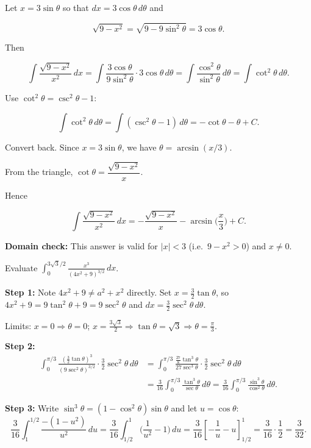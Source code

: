 \begin{examplebox}[title={Worked Example: $\displaystyle \int \frac{\sqrt{9-x^2}}{x^2}\,dx$}]

Let $x=3\sin\theta$ so that $dx=3\cos\theta\,d\theta$ and

\[
\sqrt{9-x^2}=\sqrt{9-9\sin^2\theta}=3\cos\theta.
\]

Then

\[
\int \frac{\sqrt{9-x^2}}{x^2}\,dx
=\int \frac{3\cos\theta}{9\sin^2\theta}\cdot 3\cos\theta\,d\theta
=\int \frac{\cos^2\theta}{\sin^2\theta}\,d\theta
=\int \cot^2\theta\,d\theta.
\]

Use $\cot^2\theta=\csc^2\theta-1$:

\[
\int \cot^2\theta\,d\theta=\int (\csc^2\theta-1)\,d\theta
=-\cot\theta-\theta+C.
\]

Convert back. Since $x=3\sin\theta$, we have $\theta=\arcsin(x/3)$.

From the triangle, $\cot\theta=\dfrac{\sqrt{9-x^2}}{x}$.

Hence

\[
\int \frac{\sqrt{9-x^2}}{x^2}\,dx
=-\frac{\sqrt{9-x^2}}{x}-\arcsin\!\Big(\frac{x}{3}\Big)+C.
\]

\textbf{Domain check:} This answer is valid for $|x|<3$ (i.e.\ $9-x^2>0$) and $x\neq 0$.

\end{examplebox}

\begin{examplebox}[title={Worked Example (Lecture Example 3.15): Preliminary substitution + trig sub}]

Evaluate $\displaystyle \int_0^{3\sqrt3/2}\frac{x^3}{(4x^2+9)^{3/2}}\,dx$.

\textbf{Step 1:} Note $4x^2+9\neq a^2+x^2$ directly. Set $x=\frac{3}{2}\tan\theta$, so $4x^2+9=9\tan^2\theta+9=9\sec^2\theta$ and $dx=\frac{3}{2}\sec^2\theta\,d\theta$.

Limits: $x=0\Rightarrow\theta=0$; $x=\frac{3\sqrt3}{2}\Rightarrow \tan\theta=\sqrt3\Rightarrow\theta=\frac\pi3$.

\textbf{Step 2:}
\begin{align*}
\int_0^{\pi/3}\frac{(\frac32\tan\theta)^3}{(9\sec^2\theta)^{3/2}}\cdot\frac32\sec^2\theta\,d\theta
&= \int_0^{\pi/3}\frac{\frac{27}{8}\tan^3\theta}{27\sec^3\theta}\cdot\frac32\sec^2\theta\,d\theta\\
&= \frac{3}{16}\int_0^{\pi/3}\frac{\tan^3\theta}{\sec\theta}\,d\theta
= \frac{3}{16}\int_0^{\pi/3}\frac{\sin^3\theta}{\cos^2\theta}\,d\theta.
\end{align*}

\textbf{Step 3:} Write $\sin^3\theta=(1-\cos^2\theta)\sin\theta$ and let $u=\cos\theta$:
\[
\frac{3}{16}\int_1^{1/2}\frac{-(1-u^2)}{u^2}\,du
= \frac{3}{16}\int_{1/2}^{1}\Big(\frac{1}{u^2}-1\Big)\,du
= \frac{3}{16}\left[-\frac1u-u\right]_{1/2}^{1}
= \frac{3}{16}\cdot\frac{1}{2}=\frac{3}{32}.
\]

\end{examplebox}

